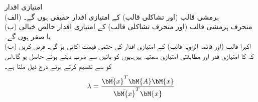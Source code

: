 \quad امتیازی اقدار\\
(الف) ہرمشی قالب (اور تشاکلی قالب) کے امتیازی اقدار حقیقی ہوں گے۔\\
(ب) منحرف ہرمشی قالب (اور منحرف تشاکلی قالب) کے امتیازی اقدار خالص خیالی یا صفر  ہوں گے۔\\
(پ) اکہرا قالب (اور قائمہ الزاویہ قالب) کے امتیازی اقدار کی حتمی قیمت اکائی  ہو گی۔
فرض کریں کہ  کا امتیازی قدر   اور مطابقتی امتیازی سمتیہ   ہیں۔یوں  کو بائیں   سے ضرب دیتے ہوئے  حاصل ہو گا۔اس کو   سے تقسیم کرتے ہوئے درج ذیل ملتا ہے۔
\begin{align}\label{مساوات_امتیازی_مسئلہ_اقدار_الف}
\lambda=\frac{\bar{\bM{x}}^T\bM{A}\bM{x}}{\bar{\bM{x}}^T\bM{x}}
\end{align}

